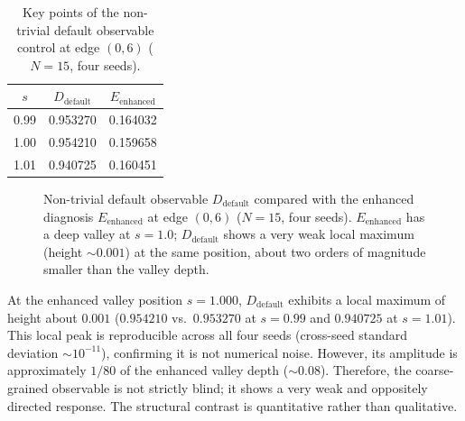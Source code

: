 \documentclass[aps,prb,reprint,superscriptaddress]{revtex4-2}
\begin{document}
\begin{table}[h]
\centering
\caption{Key points of the non-trivial default observable control at edge $(0,6)$ ($N=15$, four seeds).}
\label{tab:default_control}
\begin{tabular}{ccc}
\toprule
$s$ & $D_{\text{default}}$ & $E_{\text{enhanced}}$ \\
\midrule
0.99 & 0.953270 & 0.164032 \\
1.00 & 0.954210 & 0.159658 \\
1.01 & 0.940725 & 0.160451 \\
\bottomrule
\end{tabular}
\end{table}

\begin{figure}[t]
\centering
{}
\caption{Non-trivial default observable $D_{\text{default}}$ compared with the enhanced diagnosis $E_{\text{enhanced}}$ at edge $(0,6)$ ($N=15$, four seeds). $E_{\text{enhanced}}$ has a deep valley at $s=1.0$; $D_{\text{default}}$ shows a very weak local maximum (height $\sim0.001$) at the same position, about two orders of magnitude smaller than the valley depth.}
\label{fig:default_control}
\end{figure}

At the enhanced valley position $s=1.000$, $D_{\text{default}}$ exhibits a local maximum of height about $0.001$ ($0.954210$ vs.\ $0.953270$ at $s=0.99$ and $0.940725$ at $s=1.01$). This local peak is reproducible across all four seeds (cross-seed standard deviation $\sim10^{-11}$), confirming it is not numerical noise. However, its amplitude is approximately $1/80$ of the enhanced valley depth ($\sim0.08$). Therefore, the coarse-grained observable is not strictly blind; it shows a very weak and oppositely directed response. The structural contrast is quantitative rather than qualitative.
\end{document}
